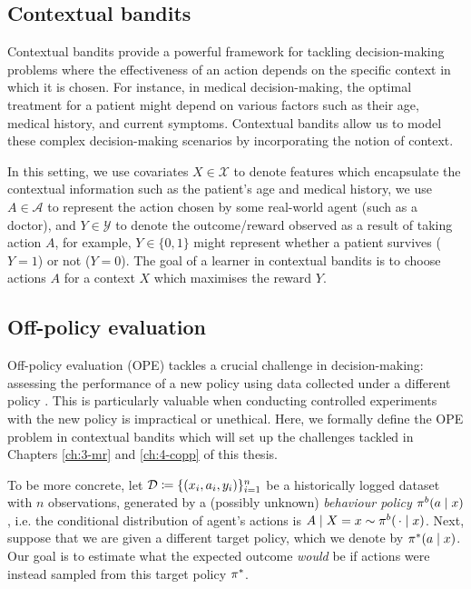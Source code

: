 \subsection{Contextual bandits}
Contextual bandits \citep{Lattimore_Szepesvári_2020} provide a powerful framework for tackling decision-making problems where the effectiveness of an action depends on the specific context in which it is chosen. 
For instance, in medical decision-making, the optimal treatment for a patient might depend on various factors such as their age, medical history, and current symptoms. 
Contextual bandits allow us to model these complex decision-making scenarios by incorporating the notion of context.

In this setting, we use covariates $X \in \mathcal{X}$ to denote features which encapsulate the contextual information such as the patient's age and medical history, we use $A \in \mathcal{A}$ to represent the action chosen by some real-world agent (such as a doctor), and $Y \in \mathcal{Y}$ to denote the outcome/reward observed as a result of taking action $A$, for example, $Y \in \{0, 1\}$ might represent whether a patient survives ($Y=1$) or not ($Y=0$). The goal of a learner in contextual bandits is to choose actions $A$ for a context $X$ which maximises the reward $Y$. 

\subsection{Off-policy evaluation}
Off-policy evaluation (OPE) tackles a crucial challenge in decision-making: assessing the performance of a new policy using data collected under a different policy \citep{swaminathan2015counterfactual, wang2017optimal, farajtabar2018more, su2019continuous, metelli2021subgaussian, liu2019triply, sugiyama2012machine, swaminathan2017off}. This is particularly valuable when conducting controlled experiments with the new policy is impractical or unethical. Here, we formally define the OPE problem in contextual bandits which will set up the challenges tackled in Chapters \ref{ch:3-mr} and \ref{ch:4-copp} of this thesis. 

To be more concrete, let $\mathcal{D}\coloneqq \{(x_i, a_i, y_i)\}_{i=1}^n$ be a historically logged dataset with $n$ observations, generated by a (possibly unknown) \emph{behaviour policy} $\pi^b(a\mid x)$, i.e. the conditional distribution of agent's actions is $A\mid X=x \sim \pi^b(\,\cdot\mid x)$.
Next, suppose that we are given a different target policy, which we denote by $\pi^*(a\mid x)$. Our goal is to estimate what the expected outcome \emph{would} be if actions were instead sampled from this target policy $\pi^*$.

